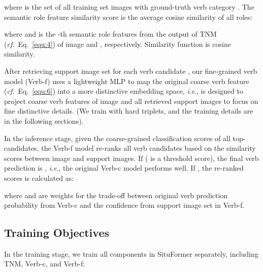\documentclass[letterpaper]{article} \usepackage{aaai22}  \usepackage{times}  \usepackage{helvet}  \usepackage{courier}  \usepackage[hyphens]{url}  \usepackage{graphicx} \urlstyle{rm} \def\UrlFont{\rm}  \usepackage{natbib}  \usepackage{caption} \DeclareCaptionStyle{ruled}{labelfont=normalfont,labelsep=colon,strut=off} \frenchspacing  \setlength{\pdfpagewidth}{8.5in}  \setlength{\pdfpageheight}{11in}
\newcommand{\ie}{\textit{i}.\textit{e}.}
\newcommand{\cf}{\textit{cf.}}
\begin{document}
where  is the set of all training set images with ground-truth verb category . The semantic role feature similarity score  is the average cosine similarity of all roles:

where  and  is the -th semantic role features from the output of TNM (\cf~Eq.~\eqref{equ:4}) of image  and , respectively. Similarity function  is cosine similarity.





After retrieving support image set  for each verb candidate , our fine-grained verb model (Verb-f) uses a lightweight MLP  to map the original coarse verb feature  (\cf~Eq.~\eqref{equ:6}) into a more distinctive embedding space, \ie,  is designed to project coarse verb features of image  and all retrieved support images to focus on fine distinctive details. (We train  with hard triplets, and the training details are in the following sections).


In the inference stage, given the coarse-grained classification scores  of all top- candidates, the Verb-f model re-ranks all verb candidates based on the similarity scores between image  and support images. If  ( is a threshold score), the final verb prediction is , \ie, the original Verb-c model performs well. If , the re-ranked scores  is calculated as:

where  and  are weights for the trade-off between original verb prediction probability  from Verb-c and the confidence from support image set in Verb-f.































\subsection{Training Objectives}
\label{sec:training}

In the training stage, we train all components in SituFormer separately, including TNM, Verb-c, and Verb-f:
\end{document}
